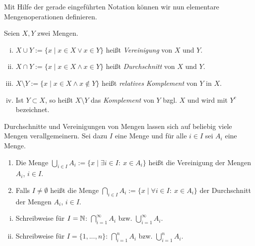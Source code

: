 \vspace*{3em}
Mit Hilfe der gerade eingeführten Notation können wir nun elementare
Mengenoperationen definieren.


\begin{mydef}
Seien $X,Y$ zwei Mengen.
\begin{enumerate}[(i)]
\item $X \cup Y := \{x \mid x \in X \vee x \in Y \}$
heißt \textit{Vereinigung} von $X$ und $Y$.

\item $X \cap Y := \{x \mid x \in X \wedge x \in Y \}$
heißt \textit{Durchschnitt} von $X$ und $Y$.

\item $X \setminus Y := \{x \mid x \in X \wedge x \notin Y \}$
heißt \textit{relatives Komplement} von $Y$ in $X$.

\item Ist $Y \subset X$, so heißt $X \setminus Y$
das \textit{Komplement} von $Y$ bzgl. $X$ und wird mit $Y^c$ bezeichnet.
\end{enumerate}
\end{mydef}


\begin{mydef}
Durchschnitte und Vereinigungen von Mengen lassen sich auf beliebig viele
Mengen verallgemeinern.
Sei dazu $I$ eine Menge und für alle $i \in I$ sei $A_i$ eine Menge.

\begin{enumerate}
\item Die Menge
$\bigcup_{i \in I} A_i := \{x \mid \exists i \in I\!:\ x \in A_i \}$
heißt die Vereinigung der Mengen $A_i$, $i \in I$.

\item Falls $I \neq \emptyset$ heißt die Menge
$\bigcap_{i \in I} A_i := \{x \mid \forall i \in I\!:\ x \in A_i \}$
der Durchschnitt der Mengen $A_i$, $i \in I$.
\end{enumerate}
\end{mydef}


\begin{remark}
\begin{enumerate}[(i)]
\item Schreibweise für $I = \mathbb{N}$: $\bigcap_{i=1}^{\infty}A_i$ bzw.
$\bigcup_{i=1}^{\infty}A_i$.

\item Schreibweise für $I = \{1,...,n\}$: $\bigcap_{i=1}^n A_i$ bzw.
$\bigcup_{i=1}^n A_i$.
\end{enumerate}
\end{remark}
